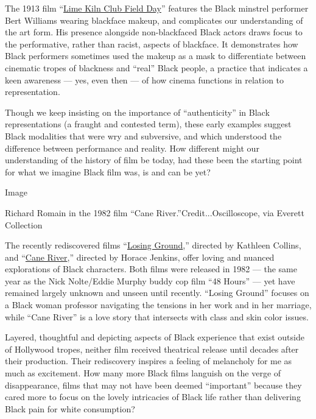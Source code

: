 The 1913 film
``\href{https://silentfilm.org/bert-williams-lime-kiln-club-field-day/}{Lime
Kiln Club Field Day}'' features the Black minstrel performer Bert
Williams wearing blackface makeup, and complicates our understanding of
the art form. His presence alongside non-blackfaced Black actors draws
focus to the performative, rather than racist, aspects of blackface. It
demonstrates how Black performers sometimes used the makeup as a mask to
differentiate between cinematic tropes of blackness and ``real'' Black
people, a practice that indicates a keen awareness --- yes, even then
--- of how cinema functions in relation to representation.

Though we keep insisting on the importance of ``authenticity'' in Black
representations (a fraught and contested term), these early examples
suggest Black modalities that were wry and subversive, and which
understood the difference between performance and reality. How different
might our understanding of the history of film be today, had these been
the starting point for what we imagine Black film was, is and can be
yet?

Image

Richard Romain in the 1982 film ``Cane River.''Credit...Oscilloscope,
via Everett Collection

The recently rediscovered films
``\href{https://www.nytimes3xbfgragh.onion/2016/04/17/movies/losing-ground-meditates-on-art-as-it-examines-a-marriage-in-peril.html}{Losing
Ground},'' directed by Kathleen Collins, and
``\href{https://www.nytimes3xbfgragh.onion/2020/02/06/movies/cane-river-review.html}{Cane
River},'' directed by Horace Jenkins, offer loving and nuanced
explorations of Black characters. Both films were released in 1982 ---
the same year as the Nick Nolte/Eddie Murphy buddy cop film ``48 Hours''
--- yet have remained largely unknown and unseen until recently.
``Losing Ground'' focuses on a Black woman professor navigating the
tensions in her work and in her marriage, while ``Cane River'' is a love
story that intersects with class and skin color issues.

Layered, thoughtful and depicting aspects of Black experience that exist
outside of Hollywood tropes, neither film received theatrical release
until decades after their production. Their rediscovery inspires a
feeling of melancholy for me as much as excitement. How many more Black
films languish on the verge of disappearance, films that may not have
been deemed ``important'' because they cared more to focus on the lovely
intricacies of Black life rather than delivering Black pain for white
consumption?

